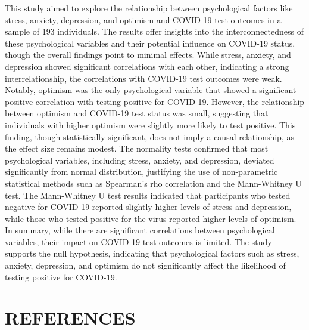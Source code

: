 \documentclass[a4paper]{article}
\begin{document}
\noindent
This study aimed to explore the relationship between psychological factors like stress, anxiety, depression, and optimism and COVID-19 test outcomes in a sample of 193 individuals.\newline
The results offer insights into the interconnectedness of these psychological variables and their potential influence on COVID-19 status, though the overall findings point to minimal effects.
\vspace{0.5em}\newline
While stress, anxiety, and depression showed significant correlations with each other, indicating a strong interrelationship, the correlations with COVID-19 test outcomes were weak.
Notably, optimism was the only psychological variable that showed a significant positive correlation with testing positive for COVID-19.
\vspace{0.5em}\newline
However, the relationship between optimism and COVID-19 test status was small, suggesting that individuals with higher optimism were slightly more likely to test positive.
This finding, though statistically significant, does not imply a causal relationship, as the effect size remains modest.
\vspace{0.5em}\newline
The normality tests confirmed that most psychological variables, including stress, anxiety, and depression, deviated significantly from normal distribution,
justifying the use of non-parametric statistical methods such as Spearman’s rho correlation and the Mann-Whitney U test.
The Mann-Whitney U test results indicated that participants who tested negative for COVID-19 reported slightly higher levels of stress and depression,
while those who tested positive for the virus reported higher levels of optimism.
\vspace{0.5em}\newline
In summary, while there are significant correlations between psychological variables, their impact on COVID-19 test outcomes is limited. The study supports the null hypothesis, indicating that psychological factors such as stress, anxiety, depression, and optimism do not significantly affect the likelihood of testing positive for COVID-19.

\newpage
\section{REFERENCES}



\end{document}

